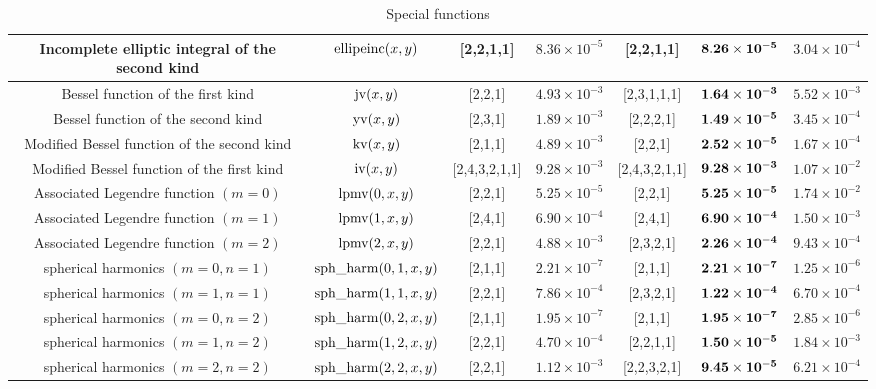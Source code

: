 \documentclass{article}
\numberwithin{equation}{section}
\numberwithin{figure}{section}
\begin{document}
\begin{table}[t]
{\begin{tabular}{|c|c|c|c|c|c|c|}
    Incomplete elliptic integral of the second kind & ${\rm ellipeinc}(x,y)$ & [2,2,1,1] & $8.36\times 10^{-5}$ & [2,2,1,1] & ${\bf 8.26\times 10^{-5}}$ & $3.04\times 10^{-4}$ \\\hline
    Bessel function of the first kind & ${\rm jv}(x,y)$ & [2,2,1] & $4.93\times 10^{-3}$ & [2,3,1,1,1] & ${\bf 1.64\times 10^{-3}}$ & $5.52\times 10^{-3}$\\\hline
    Bessel function of the second kind & ${\rm yv}(x,y)$ & [2,3,1] & $1.89\times 10^{-3}$ & [2,2,2,1] & ${\bf 1.49\times 10^{-5}}$ &  $3.45\times 10^{-4}$ \\\hline
    Modified Bessel function of the second kind & ${\rm kv}(x,y)$ & [2,1,1] & $4.89\times 10^{-3}$ & [2,2,1] & ${\bf 2.52\times 10^{-5}}$ & $1.67\times 10^{-4}$ \\\hline
    Modified Bessel function of the first kind & ${\rm iv}(x,y)$ & [2,4,3,2,1,1] & $9.28\times 10^{-3}$ & [2,4,3,2,1,1] & ${\bf 9.28\times 10^{-3}}$ & $1.07\times 10^{-2}$\\\hline
    Associated Legendre function $(m=0)$ & ${\rm lpmv}(0,x,y)$ & [2,2,1] & $5.25\times 10^{-5}$ & [2,2,1] & ${\bf 5.25\times 10^{-5}}$ & $1.74\times 10^{-2}$ \\\hline
    Associated Legendre function $(m=1)$ & ${\rm lpmv}(1,x,y)$ & [2,4,1] & $6.90\times 10^{-4}$ & [2,4,1] & ${\bf 6.90\times 10^{-4}}$ & $1.50\times 10^{-3}$ \\\hline
    Associated Legendre function $(m=2)$ & ${\rm lpmv}(2,x,y)$ & [2,2,1] & $4.88\times 10^{-3}$ & [2,3,2,1] & ${\bf 2.26\times 10^{-4}}$ & $9.43\times 10^{-4}$ \\\hline
    spherical harmonics $(m=0,n=1)$ & ${\rm sph\_harm}(0,1,x,y)$ & [2,1,1] & $2.21\times 10^{-7}$ & [2,1,1] & ${\bf 2.21\times 10^{-7}}$ & $1.25\times 10^{-6}$ \\\hline
    spherical harmonics $(m=1,n=1)$ & ${\rm sph\_harm}(1,1,x,y)$ & [2,2,1] & $7.86\times 10^{-4}$ & [2,3,2,1] & ${\bf 1.22\times 10^{-4}}$ & $6.70\times 10^{-4}$ \\\hline
    spherical harmonics $(m=0,n=2)$ & ${\rm sph\_harm}(0,2,x,y)$ & [2,1,1] & $1.95\times 10^{-7}$ & [2,1,1] & ${\bf 1.95\times 10^{-7}}$ & $2.85\times 10^{-6}$  \\\hline
    spherical harmonics $(m=1,n=2)$ & ${\rm sph\_harm}(1,2,x,y)$ & [2,2,1] & $4.70\times 10^{-4}$ & [2,2,1,1] & ${\bf 1.50\times 10^{-5}}$ & $1.84\times 10^{-3}$  \\\hline
    spherical harmonics $(m=2,n=2)$ & ${\rm sph\_harm}(2,2,x,y)$ & [2,2,1] & $1.12\times 10^{-3}$ & [2,2,3,2,1] & ${\bf 9.45\times 10^{-5}}$ & $6.21\times 10^{-4}$  \\\hline
    \end{tabular}}
    \vspace{2mm}
    \caption{Special functions}
    \label{tab:special_kan_shape}
\end{table}
\end{document}
